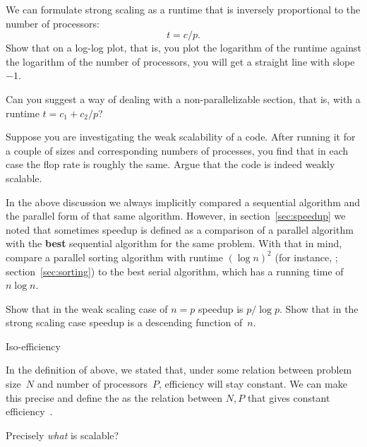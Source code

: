 \begin{exercise}
  We can formulate strong scaling as a runtime that is inversely
  proportional to the number of processors: \[ t=c/p. \]
  Show that on a log-log plot, that is, you plot the logarithm of the
  runtime against the logarithm of the number of processors,
  you will get a straight line with slope~$-1$.

  Can you suggest a way of dealing with a non-parallelizable
  section, that is, with a runtime $t=c_1+c_2/p$?
\end{exercise}

\begin{exercise}
  Suppose you are investigating the weak scalability of a code.
  After running it for a couple of sizes and corresponding numbers
  of processes, you find that in each case the flop rate is roughly the same.
  Argue that the code is indeed weakly scalable.
\end{exercise}

\begin{exercise}
  In the above discussion we always implicitly compared a sequential 
  algorithm and the parallel form of that same algorithm. However, 
  in section~\ref{sec:speedup} we noted that sometimes speedup is defined
  as a comparison of a parallel algorithm with the \textbf{best} sequential
  algorithm for the same problem. With that in mind, compare a parallel sorting
  algorithm with runtime $(\log n)^2$ (for instance, ;
  section~\ref{sec:sorting}) to the best serial algorithm, which has 
  a running time of $n\log n$.

  Show that in the weak scaling case of $n=p$ speedup is $p/\log p$.
  Show that in the strong scaling case speedup is a descending function of~$n$.
\end{exercise}

 {Iso-efficiency}
\label{sec:iso-efficiency}

In the definition of  above, we stated
that, under some relation between problem size~$N$ and number of
processors~$P$, efficiency will stay constant. We can make this
precise and define the  as the
relation between $N,P$ that gives constant
efficiency~\cite{Grama:1993:isoefficiency}.

 {Precisely \emph{what} is scalable?}

